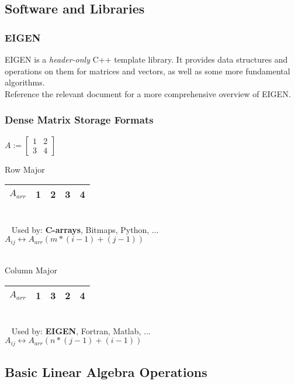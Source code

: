 \documentclass[12pt]{article}
\begin{document}
\subsection{Software and Libraries}
\subsubsection{EIGEN}
EIGEN is a \textit{header-only} C++ template library. It provides data structures and operations on them for matrices and vectors, as well as some more fundamental algorithms.\\%
Reference the relevant document for a more comprehensive overview of EIGEN.
\subsubsection{}
\subsubsection{Dense Matrix Storage Formats}
$A := \begin{bmatrix}1 & 2 \\ 3 & 4 \end{bmatrix}$\\
\begin{large}Row Major\end{large} 
\begin{tabular}{|c|c|c|c|c|}
\hline $A_{arr}$ & 1 & 2 & 3 & 4\\
\hline
\end{tabular}\\
\-\ \hspace*{0.2cm} Used by: \textbf{C-arrays}, Bitmaps, Python, ...\\
$A_{ij} \leftrightarrow A_{arr} (m*(i-1)+(j-1))$\\\\
\begin{large}Column Major\end{large} 
\begin{tabular}{|c|c|c|c|c|}
\hline $A_{arr}$ & 1 & 3 & 2 & 4\\
\hline
\end{tabular}\\
\-\ \hspace*{0.2cm} Used by: \textbf{EIGEN}, Fortran, Matlab, ...\\
$A_{ij} \leftrightarrow A_{arr} (n*(j-1) + (i-1))$
\subsection{Basic Linear Algebra Operations}
\end{document}
